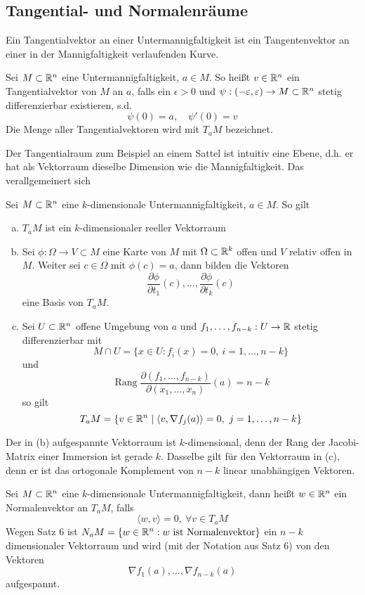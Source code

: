 \subsection*{Tangential- und Normalenräume}
Ein Tangentialvektor an einer Untermannigfaltigkeit ist ein Tangentenvektor
an einer in der Mannigfaltigkeit verlaufenden Kurve. 
\begin{defn}
    Sei $M\subset \mathbb{R}^n$ eine Untermannigfaltigkeit, $a\in M$. So heißt $v\in \mathbb{R}^n$ ein Tangentialvektor von $M$ an $a$, falls 
    ein $\epsilon>0$ und $\psi:(-\varepsilon,\varepsilon)\to M\subset \mathbb{R}^n$ stetig differenzierbar existieren, s.d. 
    \[
    \psi(0) = a, \quad \psi'(0)=v    
    \]
    Die Menge aller Tangentialvektoren wird mit $T_aM$ bezeichnet.
\end{defn}
Der Tangentialraum zum Beispiel an einem Sattel ist intuitiv eine Ebene, d.h. er hat als Vektorraum dieselbe Dimension
wie die Mannigfaltigkeit. Das verallgemeinert sich 
\begin{satz}
    Sei $M\subset \mathbb{R}^n$ eine $k$-dimensionale Untermannigfaltigkeit, $a\in M$. So gilt
    \begin{enumerate}[(a)]
        \item $T_aM$ ist ein $k$-dimensionaler reeller Vektorraum
        \item Sei $\phi:\Omega\to V\subset M$ eine Karte von $M$ mit $\Omega\subset\mathbb{R}^k$ offen und $V$ relativ offen in $M$. Weiter sei $c\in \Omega$ mit $\phi(c)=a$, dann bilden die Vektoren
        \[
        \frac{\partial \phi}{\partial t_1}(c),\ldots,\frac{\partial\phi}{\partial t_k}(c)    
        \]
        eine Basis von $T_aM$.
        \item Sei $U\subset \mathbb{R}^n$ offene Umgebung von $a$ und $f_1,\ldots,f_{n-k}:U\to \mathbb{R}$ stetig differenzierbar mit 
        \[
        M\cap U = \{ x\in U : f_i(x)=0, \ i=1,\ldots,n-k\}    
        \]
        und 
        \[
        \operatorname{Rang} \frac{\partial(f_1,\ldots,f_{n-k})}{\partial(x_1,\ldots,x_n)}(a)=n-k    
        \]
        so gilt 
        \[
        T_aM = \{ v\in \mathbb{R}^n \mid \langle v,\nabla f_j(a)\rangle = 0, \ j=1,\ldots,n-k\}    
        \]
    \end{enumerate}
\end{satz}
Der in (b) aufgespannte Vektorraum ist $k$-dimensional, denn der Rang der Jacobi-Matrix einer Immersion ist gerade $k$. Dasselbe gilt für den Vektorraum in (c), denn er ist das ortogonale Komplement von $n-k$ linear unabhängigen Vektoren. 
\begin{defn}
    Sei $M\subset \mathbb{R}^n$ eine $k$-dimensionale Untermannigfaltigkeit, dann heißt $w\in \mathbb{R}^n$ ein Normalenvektor an $T_a M$, falls 
    \[
    \langle w,v\rangle = 0, \ \forall v\in T_aM    
    \]
    Wegen Satz 6 ist $N_aM = \{ w\in \mathbb{R}^n : w \text{ ist Normalenvektor}\}$ ein $n-k$ dimensionaler Vektorraum und wird (mit der Notation aus Satz 6) von den Vektoren
    \[
    \nabla f_1(a),\ldots,\nabla f_{n-k}(a)    
    \]
    aufgespannt. 
\end{defn}
